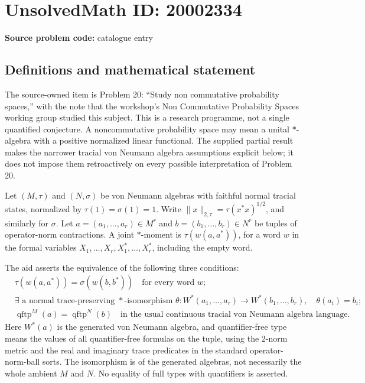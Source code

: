 \documentclass[11pt]{article}
\begin{document}
\section*{UnsolvedMath ID: 20002334}
\textbf{Source problem code:} catalogue entry
\subsection{Definitions and mathematical statement}
The source-owned item is Problem 20: ``Study non commutative probability spaces,'' with the note that the workshop's Non Commutative Probability Spaces working group studied this subject. This is a research programme, not a single quantified conjecture. A noncommutative probability space may mean a unital \(*\)-algebra with a positive normalized linear functional. The supplied partial result makes the narrower tracial von Neumann algebra assumptions explicit below; it does not impose them retroactively on every possible interpretation of Problem 20.

Let \((M,\tau)\) and \((N,\sigma)\) be von Neumann algebras with faithful normal tracial states, normalized by \(\tau(1)=\sigma(1)=1\). Write \(\|x\|_{2,\tau}=\tau(x^*x)^{1/2}\), and similarly for \(\sigma\). Let \(a=(a_1,\ldots,a_r)\in M^r\) and \(b=(b_1,\ldots,b_r)\in N^r\) be tuples of operator-norm contractions. A joint \(*\)-moment is \(\tau(w(a,a^*))\), for a word \(w\) in the formal variables \(X_1,\ldots,X_r,X_1^*,\ldots,X_r^*\), including the empty word.

The aid asserts the equivalence of the following three conditions:
\[
\begin{aligned}
 &\tau(w(a,a^*))=\sigma(w(b,b^*))\quad\text{for every word }w;\\
 &\exists\text{ a normal trace-preserving }*\text{-isomorphism }
 \theta:W^*(a_1,\ldots,a_r)\to W^*(b_1,\ldots,b_r),
 \quad\theta(a_i)=b_i;\\
 &\operatorname{qftp}^{M}(a)=\operatorname{qftp}^{N}(b)
 \quad\text{in the usual continuous tracial von Neumann algebra language}.
\end{aligned}
\]
Here \(W^*(a)\) is the generated von Neumann algebra, and quantifier-free type means the values of all quantifier-free formulas on the tuple, using the \(2\)-norm metric and the real and imaginary trace predicates in the standard operator-norm-ball sorts. The isomorphism is of the generated algebras, not necessarily the whole ambient \(M\) and \(N\). No equality of full types with quantifiers is asserted.
\end{document}
